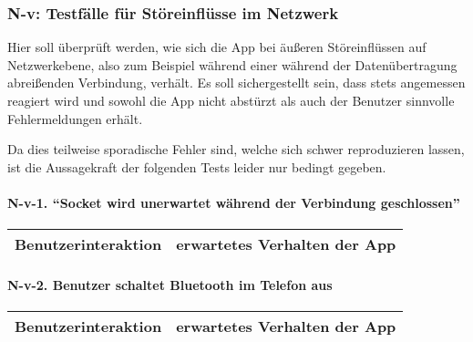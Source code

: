 \clearpage
\subsubsection{N-v: Testfälle für Störeinflüsse im
Netzwerk}\label{v-testfuxe4lle-fuxfcr-stuxf6reinfluxfcsse-im-netzwerk}

Hier soll überprüft werden, wie sich die App bei äußeren Störeinflüssen
auf Netzwerkebene, also zum Beispiel während einer während der
Datenübertragung abreißenden Verbindung, verhält. Es soll sichergestellt
sein, dass stets angemessen reagiert wird und sowohl die App nicht
abstürzt als auch der Benutzer sinnvolle Fehlermeldungen erhält.

Da dies teilweise sporadische Fehler sind, welche sich schwer
reproduzieren lassen, ist die Aussagekraft der folgenden Tests leider
nur bedingt gegeben.

\paragraph{\texorpdfstring{N-v-1. ``Socket wird unerwartet während der
Verbindung
geschlossen''}{N-v-1. Socket wird unerwartet während der Verbindung geschlossen}}\label{socket-wird-unerwartet-wuxe4hrend-der-verbindung-geschlossen}

\begin{longtable}{p{8cm}p{8.5cm}}
\toprule
Benutzerinteraktion & erwartetes Verhalten der App\tabularnewline
\midrule
\endhead
\bottomrule
\end{longtable}

\paragraph{N-v-2. Benutzer schaltet Bluetooth im Telefon
aus}\label{benutzer-schaltet-bluetooth-im-telefon-aus}

\begin{longtable}{p{8cm}p{8.5cm}}
\toprule
Benutzerinteraktion & erwartetes Verhalten der App\tabularnewline
\midrule
\endhead
\bottomrule
\end{longtable}
